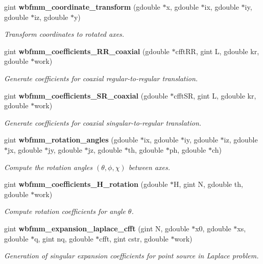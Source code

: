 \begin{DoxyCompactItemize}
gint {\bf wbfmm\+\_\+coordinate\+\_\+transform} (gdouble $\ast$x, gdouble $\ast$ix, gdouble $\ast$iy, gdouble $\ast$iz, gdouble $\ast$y)
\begin{DoxyCompactList}\small\item\em Transform coordinates to rotated axes. \end{DoxyCompactList}\item 
gint {\bf wbfmm\+\_\+coefficients\+\_\+\+R\+R\+\_\+coaxial} (gdouble $\ast$cfft\+R\+R, gint L, gdouble kr, gdouble $\ast$work)
\begin{DoxyCompactList}\small\item\em Generate coefficients for coaxial regular-\/to-\/regular translation. \end{DoxyCompactList}\item 
gint {\bf wbfmm\+\_\+coefficients\+\_\+\+S\+R\+\_\+coaxial} (gdouble $\ast$cfft\+S\+R, gint L, gdouble kr, gdouble $\ast$work)
\begin{DoxyCompactList}\small\item\em Generate coefficients for coaxial singular-\/to-\/regular translation. \end{DoxyCompactList}\item 
gint {\bf wbfmm\+\_\+rotation\+\_\+angles} (gdouble $\ast$ix, gdouble $\ast$iy, gdouble $\ast$iz, gdouble $\ast$jx, gdouble $\ast$jy, gdouble $\ast$jz, gdouble $\ast$th, gdouble $\ast$ph, gdouble $\ast$ch)
\begin{DoxyCompactList}\small\item\em Compute the rotation angles $(\theta,\phi,\chi)$ between axes. \end{DoxyCompactList}\item 
gint {\bf wbfmm\+\_\+coefficients\+\_\+\+H\+\_\+rotation} (gdouble $\ast$H, gint N, gdouble th, gdouble $\ast$work)
\begin{DoxyCompactList}\small\item\em Compute rotation coefficients for angle $\theta$. \end{DoxyCompactList}\item 
gint {\bf wbfmm\+\_\+expansion\+\_\+laplace\+\_\+cfft} (gint N, gdouble $\ast$x0, gdouble $\ast$xs, gdouble $\ast$q, gint nq, gdouble $\ast$cfft, gint cstr, gdouble $\ast$work)
\begin{DoxyCompactList}\small\item\em Generation of singular expansion coefficients for point source in Laplace problem. \end{DoxyCompactList}\item 

\end{DoxyCompactItemize}
